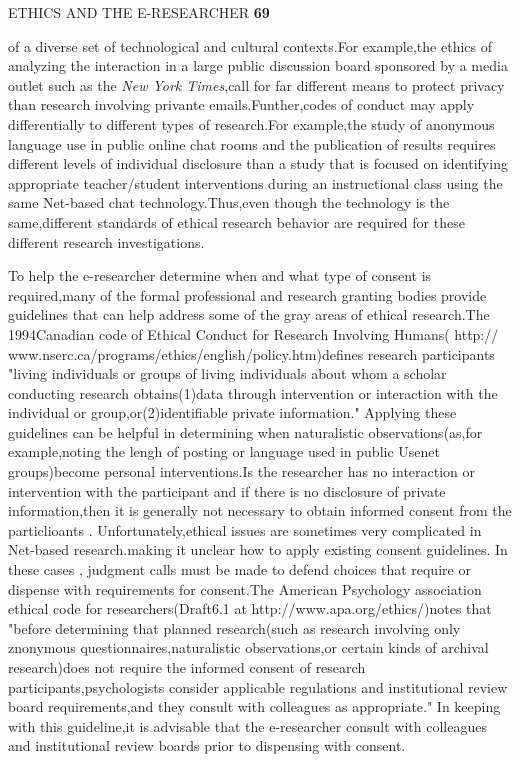 \documentclass[10pt,a4paper]{book}
\begin{document}
\begin{flushright}
  \textmd{ETHICS AND THE E-RESEARCHER} \quad \textbf{69}
\end{flushright}

\!\!\!\!\!\!\!\!\!\!of a diverse set of technological and cultural contexts.For example,the ethics of analyzing the interaction in a large public discussion board sponsored by a media outlet such as the \emph{New York Times},call for far different means to protect privacy than research involving privante emails.Funther,codes of conduct may apply differentially to different types of research.For example,the study of anonymous language use in public online chat rooms and the publication of results requires different levels of individual disclosure than a study that is focused on identifying appropriate teacher/student interventions during an instructional class using the same Net-based chat technology.Thus,even though the technology is the same,different standards of ethical research behavior are required for these different research investigations.

To help the e-researcher determine when and what type of consent is required,many of the formal professional and research granting bodies provide guidelines that can help address some of the gray areas of ethical research.The 1994Canadian code of Ethical Conduct for Research Involving Humans( http:// www.nserc.ca/programs/ethics/english/policy.htm)defines research participants "living individuals or groups of living individuals about whom a scholar conducting research obtains(1)data through intervention or interaction with the individual or group,or(2)identifiable private information." Applying these guidelines can be helpful in determining when naturalistic observations(as,for example,noting the lengh of posting or language used in public Usenet groups)become personal interventions.Is the researcher has no interaction or intervention with the participant and if there is no disclosure of private information,then it is generally not necessary to obtain informed consent from the particlioants . Unfortunately,ethical issues are sometimes very complicated in Net-based research.making it unclear how to apply existing consent guidelines. In these cases , judgment calls must be made to defend choices that require or dispense with requirements for consent.The American Psychology association ethical code for researchers(Draft6.1 at http://www.apa.org/ethics/)notes that "before determining that planned research(such as research involving only znonymous questionnaires,naturalistic observations,or certain kinds of archival research)does not require the informed consent of research participants,psychologists consider applicable regulations and institutional review board requirements,and they consult with colleagues as appropriate." In keeping with this guideline,it is advisable that the e-researcher consult with colleagues and institutional review boards prior to dispensing with consent.
\end{document}

